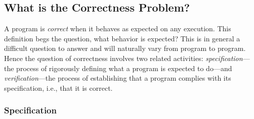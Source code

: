 






\subsection{What is the Correctness Problem?}
\label{sec:correctness_general}


A program is \emph{correct} when it behaves as expected on any execution.  This definition begs the question, what behavior is expected?  This is in general a difficult question to answer and will naturally vary from program to program.  Hence the question of correctness involves two related activities: \emph{specification}---the process of rigorously defining what a program is expected to do---and \emph{verification}---the process of establishing that a program complies with its specification, i.e., that it is correct.

\subsubsection{Specification}

